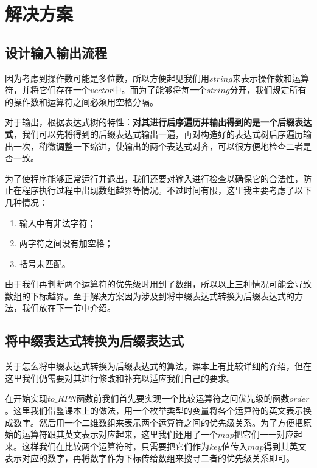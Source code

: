 \documentclass[UTF8]{ctexart}
\begin{document}
	
	\section{解决方案}
		\subsection{设计输入输出流程}\label{input and output}
		\indent 因为考虑到操作数可能是多位数，所以方便起见我们用$string$来表示操作数和运算符，并将它们存在一个$vector$中。而为了能够将每一个$string$分开，我们规定所有的操作数和运算符之间必须用空格分隔。
		
		\indent 对于输出，根据表达式树的特性：\textbf{对其进行后序遍历并输出得到的是一个后缀表达式}，我们可以先将得到的后缀表达式输出一遍，再对构造好的表达式树后序遍历输出一次，稍微调整一下缩进，使输出的两个表达式对齐，可以很方便地检查二者是否一致。
		
		\indent 为了使程序能够正常运行并退出，我们还要对输入进行检查以确保它的合法性，防止在程序执行过程中出现数组越界等情况。不过时间有限，这里我主要考虑了以下几种情况：
		\begin{enumerate}
			\item 输入中有非法字符；
			\item 两字符之间没有加空格；
			\item 括号未匹配。
		\end{enumerate}
	
		\indent 由于我们再判断两个运算符的优先级时用到了数组，所以以上三种情况可能会导致数组的下标越界。至于解决方案因为涉及到将中缀表达式转换为后缀表达式的方法，我们放在下一节中介绍。
	
		\subsection{将中缀表达式转换为后缀表达式}\label{fun to RPN}
		
		\indent 关于怎么将中缀表达式转换为后缀表达式的算法，课本\cite{data_structure}上有比较详细的介绍，但在这里我们仍需要对其进行修改和补充以适应我们自己的要求。
		
		\indent 在开始实现$to\_RPN$函数前我们首先要实现一个比较运算符之间优先级的函数$order$。这里我们借鉴课本\cite{data_structure}上的做法，用一个枚举类型的变量将各个运算符的英文表示换成数字。然后用一个二维数组来表示两个运算符之间的优先级关系。为了方便把原始的运算符跟其英文表示对应起来，这里我们还用了一个$map$把它们一一对应起来。这样我们在比较两个运算符时，只需要把它们作为$key$值传入$map$得到其英文表示对应的数字，再将数字作为下标传给数组来搜寻二者的优先级关系即可。
				
\end{document}
